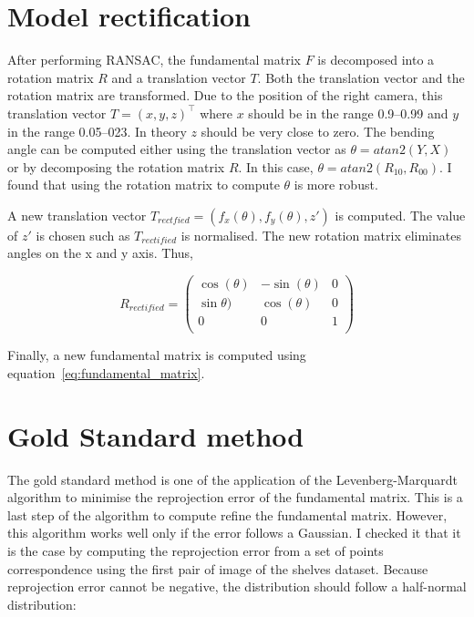 \documentclass[11pt]{report}
\begin{document}
\section{Model rectification}

After performing RANSAC, the fundamental matrix $F$ is decomposed into a rotation matrix $R$ and a translation vector $T$. Both the translation vector and the rotation matrix are transformed. Due to the position of the right camera, this translation vector $T=(x,y,z)^\top$ where $x$ should be in the range 0.9--0.99 and $y$ in the range 0.05--023. In theory $z$ should be very close to zero. The bending angle can be computed either using the translation vector as $\theta=atan2(Y,X)$ or by decomposing the rotation matrix $R$. In this case, $\theta = atan2(R_{10}, R_{00})$. I found that using the rotation matrix to compute $\theta$ is more robust.

A new translation vector $T_{rectfied}=(f_x(\theta), f_y(\theta), z')$ is computed. The value of $z'$ is chosen such as $T_{rectified}$ is normalised. The new rotation matrix eliminates angles on the x and y axis. Thus,

\[
  R_{rectified} = 
\left (
\begin{matrix}
  \cos(\theta) & -\sin(\theta) & 0 \\
  \sin\theta) & \cos(\theta) & 0 \\
  0 & 0 & 1 \\
\end{matrix}
\right )
\]

Finally, a new fundamental matrix is computed using equation~\ref{eq:fundamental_matrix}.

\section{Gold Standard method}

The gold standard method is one of the application of the Levenberg-Marquardt algorithm to minimise the reprojection error of the fundamental matrix. 
This is a last step of the algorithm to compute refine the fundamental matrix. However, this algorithm works well only if the error follows a Gaussian. I checked it that it is the case by computing the reprojection error from a set of points correspondence using the first pair of image of the shelves dataset. Because reprojection error cannot be negative, the distribution should follow a half-normal distribution:
\end{document}
